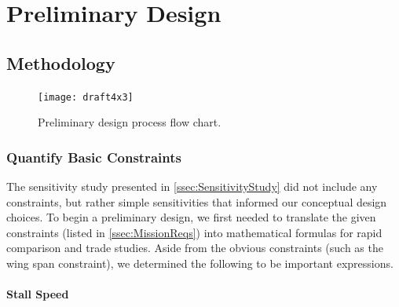 \documentclass[report]{byu-aero}
\begin{document}
\clearpage
\newpage

\section{Preliminary Design} %
\label{sec:PreliminaryDesign}


\subsection{Methodology}
\label{ssec:methodology}


\begin{figure}[h!]
	\centering
	\texttt{[image: draft4x3]}
	\caption{Preliminary design process flow chart.}
	\label{fig:prelimdesflow}
\end{figure}



\subsubsection{Quantify Basic Constraints}
\label{sssec:constraints}

The sensitivity study presented in \cref{ssec:SensitivityStudy} did not include any constraints, but rather simple sensitivities that informed our conceptual design choices.  To begin a preliminary design, we first needed to translate the given constraints (listed in \cref{ssec:MissionReqs}) into mathematical formulas for rapid comparison and trade studies. Aside from the obvious constraints (such as the wing span constraint), we determined the following to be important expressions.

\paragraph{Stall Speed}
\end{document}
